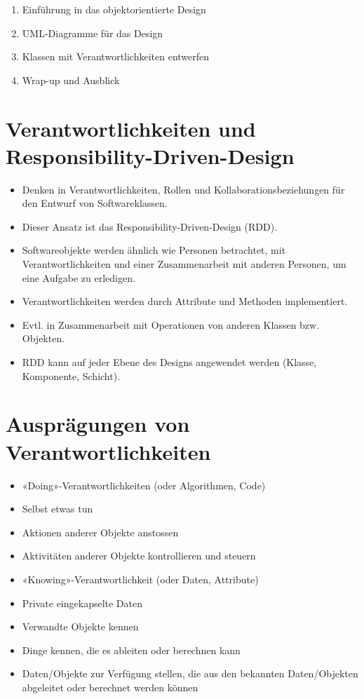 \documentclass[10pt]{article}
\begin{document}
\begin{enumerate}
  \item Einführung in das objektorientierte Design
  \item UML-Diagramme für das Design
  \item Klassen mit Verantwortlichkeiten entwerfen
  \item Wrap-up und Ausblick
\end{enumerate}

\section*{Verantwortlichkeiten und Responsibility-Driven-Design}
\begin{itemize}
  \item Denken in Verantwortlichkeiten, Rollen und Kollaborationsbeziehungen für den Entwurf von Softwareklassen.
  \item Dieser Ansatz ist das Responsibility-Driven-Design (RDD).
  \item Softwareobjekte werden ähnlich wie Personen betrachtet, mit Verantwortlichkeiten und einer Zusammenarbeit mit anderen Personen, um eine Aufgabe zu erledigen.
  \item Verantwortlichkeiten werden durch Attribute und Methoden implementiert.
  \item Evtl. in Zusammenarbeit mit Operationen von anderen Klassen bzw. Objekten.
  \item RDD kann auf jeder Ebene des Designs angewendet werden (Klasse, Komponente, Schicht).
\end{itemize}

\section*{Ausprägungen von Verantwortlichkeiten}
\begin{itemize}
  \item «Doing»-Verantwortlichkeiten (oder Algorithmen, Code)
  \item Selbst etwas tun
  \item Aktionen anderer Objekte anstossen
  \item Aktivitäten anderer Objekte kontrollieren und steuern
  \item «Knowing»-Verantwortlichkeit (oder Daten, Attribute)
  \item Private eingekapselte Daten
  \item Verwandte Objekte kennen
  \item Dinge kennen, die es ableiten oder berechnen kann
  \item Daten/Objekte zur Verfügung stellen, die aus den bekannten Daten/Objekten abgeleitet oder berechnet werden können
\end{itemize}
\end{document}
